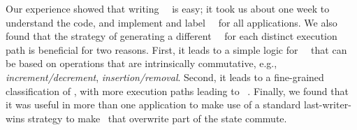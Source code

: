 Our experience sh\-owed that writing \shadow\ \transactions\ is easy;
it took us about one week to understand the code, and implement and label
\shadow\ \operations\ for all applications.
We also found that the strategy of generating a different \shadow\ \operation\ 
for each distinct execution path is beneficial for two reasons. First, it leads to 
a simple logic for \shadow\ \operations\ that can be based on operations that are 
intrinsically commutative, e.g., \emph{increment/decrement}, \emph{insertion/removal}. 
Second, it leads to a fine-grained classification of \operations, with more execution paths leading to \blue\ \operations.
Finally, we found that it was useful in more than one application to
make use of a standard
last-writer-wins strategy to make \operations\ that overwrite part
of the state commute.

